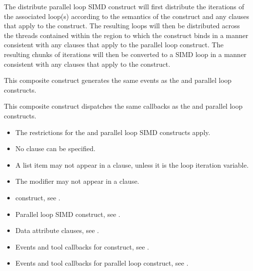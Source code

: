 \descr
The distribute parallel loop SIMD construct will first distribute the iterations of the
associated loop(s) according to the semantics of the  construct and any
clauses that apply to the  construct. The resulting loops will then be
distributed across the threads contained within the  region to which the
 construct binds in a manner consistent with any clauses that apply to the
parallel loop construct. The resulting chunks of iterations will then be converted to a
SIMD loop in a manner consistent with any clauses that apply to the  construct.

\events

This composite construct generates the same events as the  and parallel loop constructs.

\tools

This composite construct dispatches the same callbacks as the  and parallel loop constructs.

\restrictions
\begin{itemize}
\item The restrictions for the  and parallel loop SIMD constructs apply.
\item No  clause can be specified.
\item A list item may not appear in a  clause, unless it is the loop iteration variable.
\item The  modifier may not appear in a  clause.
\end{itemize}

\crossreferences
\begin{itemize}
\item {} construct, see
.

\item Parallel loop SIMD construct, see
.

\item Data attribute clauses, see .

\item Events and tool callbacks for  construct, see
.

\item Events and tool callbacks for parallel loop construct, see
.

\end{itemize}
